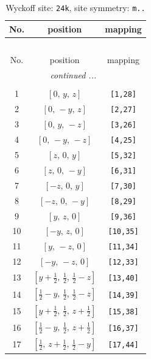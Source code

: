 \documentclass[fleqn,8pt]{jsarticle}
\begin{document}
\begin{longtable}{ccc}
\caption{Wyckoff site: {\tt 24k}, site symmetry: {\tt m..}}
 \\
 \hline \hline
No. & position & mapping \\ \hline \endfirsthead

\multicolumn{2}{l}{\tablename\ \thetable{}} \\
 \hline \hline
No. & position & mapping \\ \hline \endhead

 \hline \hline
\multicolumn{2}{r}{\footnotesize\it continued ...} \\ \endfoot

 \hline \hline
\multicolumn{2}{r}{} \\ \endlastfoot

1 & $\left[ 0,\, y,\, z \right]$ & {\tt [1,28]} \\ \hline
2 & $\left[ 0,\, - y,\, z \right]$ & {\tt [2,27]} \\ \hline
3 & $\left[ 0,\, y,\, - z \right]$ & {\tt [3,26]} \\ \hline
4 & $\left[ 0,\, - y,\, - z \right]$ & {\tt [4,25]} \\ \hline
5 & $\left[ z,\, 0,\, y \right]$ & {\tt [5,32]} \\ \hline
6 & $\left[ z,\, 0,\, - y \right]$ & {\tt [6,31]} \\ \hline
7 & $\left[ - z,\, 0,\, y \right]$ & {\tt [7,30]} \\ \hline
8 & $\left[ - z,\, 0,\, - y \right]$ & {\tt [8,29]} \\ \hline
9 & $\left[ y,\, z,\, 0 \right]$ & {\tt [9,36]} \\ \hline
10 & $\left[ - y,\, z,\, 0 \right]$ & {\tt [10,35]} \\ \hline
11 & $\left[ y,\, - z,\, 0 \right]$ & {\tt [11,34]} \\ \hline
12 & $\left[ - y,\, - z,\, 0 \right]$ & {\tt [12,33]} \\ \hline
13 & $\left[ y + \frac{1}{2},\, \frac{1}{2},\, \frac{1}{2} - z \right]$ & {\tt [13,40]} \\ \hline
14 & $\left[ \frac{1}{2} - y,\, \frac{1}{2},\, \frac{1}{2} - z \right]$ & {\tt [14,39]} \\ \hline
15 & $\left[ y + \frac{1}{2},\, \frac{1}{2},\, z + \frac{1}{2} \right]$ & {\tt [15,38]} \\ \hline
16 & $\left[ \frac{1}{2} - y,\, \frac{1}{2},\, z + \frac{1}{2} \right]$ & {\tt [16,37]} \\ \hline
17 & $\left[ \frac{1}{2},\, z + \frac{1}{2},\, \frac{1}{2} - y \right]$ & {\tt [17,44]} \\ \hline

\end{longtable}
\end{document}
